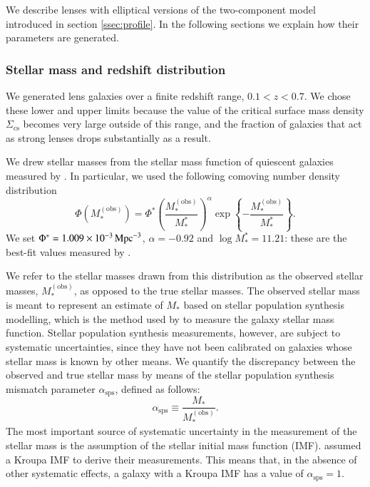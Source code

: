 \documentclass{aa}
\def\mstar{M_*}
\def\asps{\alpha_{\mathrm{sps}}}
\def\mobs{M_*^{(\mathrm{obs})}}
\begin{document}
We describe lenses with elliptical versions of the two-component model introduced in section \ref{ssec:profile}.
In the following sections we explain how their parameters are generated.

\subsubsection{Stellar mass and redshift distribution}\label{ssub:mstarz}

We generated lens galaxies over a finite redshift range, $0.1 < z < 0.7$.
We chose these lower and upper limits because the value of the critical surface mass density $\Sigma_{\mathrm{cs}}$ becomes very large outside of this range, and the fraction of galaxies that act as strong lenses drops substantially as a result.

We drew stellar masses from the stellar mass function of quiescent galaxies measured by \citet{Muz++13}.
In particular, we used the following comoving number density distribution
\begin{equation}
\Phi(\mobs) = \Phi^*\left(\frac{\mobs}{\mstar^*}\right)^{\alpha} \exp{\left\{-\frac{\mobs}{\mstar^*}\right\}}.
\end{equation}
We set $\Phi^*=1.009\times10^{-3}\,{\rm Mpc}^{-3}$, $\alpha=-0.92$ and $\log{\mstar^*}=11.21$: these are the best-fit values measured by \citet{Muz++13}.

We refer to the stellar masses drawn from this distribution as the observed stellar masses, $\mobs$, as opposed to the true stellar masses.
The observed stellar mass is meant to represent an estimate of $\mstar$ based on stellar population synthesis modelling, which is the method used by \citet{Muz++13} to measure the galaxy stellar mass function.
Stellar population synthesis measurements, however, are subject to systematic uncertainties, since they have not been calibrated on galaxies whose stellar mass is known by other means.
We quantify the discrepancy between the observed and true stellar mass by means of the stellar population synthesis mismatch parameter $\asps$, defined as follows:
\begin{equation}
\asps \equiv \frac{\mstar}{\mobs}.
\end{equation}
The most important source of systematic uncertainty in the measurement of the stellar mass is the assumption of the stellar initial mass function (IMF). \citet{Muz++13} assumed a Kroupa IMF \citep{Kro01} to derive their measurements. This means that, in the absence of other systematic effects, a galaxy with a Kroupa IMF has a value of $\asps=1$.
\end{document}
